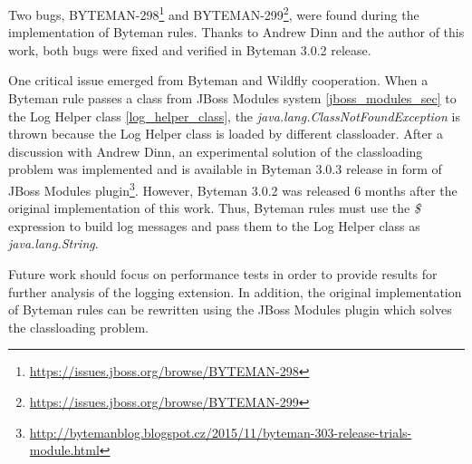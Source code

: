 \documentclass[12pt,oneside]{fithesis2}
\begin{document}
Two bugs, BYTEMAN-298\footnote{\url{https://issues.jboss.org/browse/BYTEMAN-298}} and BYTEMAN-299\footnote{\url{https://issues.jboss.org/browse/BYTEMAN-299}}, were found during the implementation of Byteman rules. Thanks to Andrew Dinn and the author of this work, both bugs were fixed and verified in Byteman 3.0.2 release. 

One critical issue emerged from Byteman and Wildfly cooperation. When a Byteman rule passes a class from JBoss Modules system \ref{jboss_modules_sec} to the Log Helper class \ref{log_helper_class}, the \textit{java.lang.ClassNotFoundException} is thrown because the Log Helper class is loaded by different classloader. After a discussion with Andrew Dinn, an experimental solution of the classloading problem was implemented and is available in Byteman 3.0.3 release in form of JBoss Modules plugin\footnote{\url{http://bytemanblog.blogspot.cz/2015/11/byteman-303-release-trials-module.html}}. However, Byteman 3.0.2 was released 6 months after the original implementation of this work. Thus, Byteman rules must use the \textit{\$} expression to build log messages and pass them to the Log Helper class as \textit{java.lang.String}.

Future work should focus on performance tests in order to provide results for further analysis of the logging extension. In addition, the original implementation of Byteman rules can be rewritten using the JBoss Modules plugin which solves the classloading problem.



\end{document}
